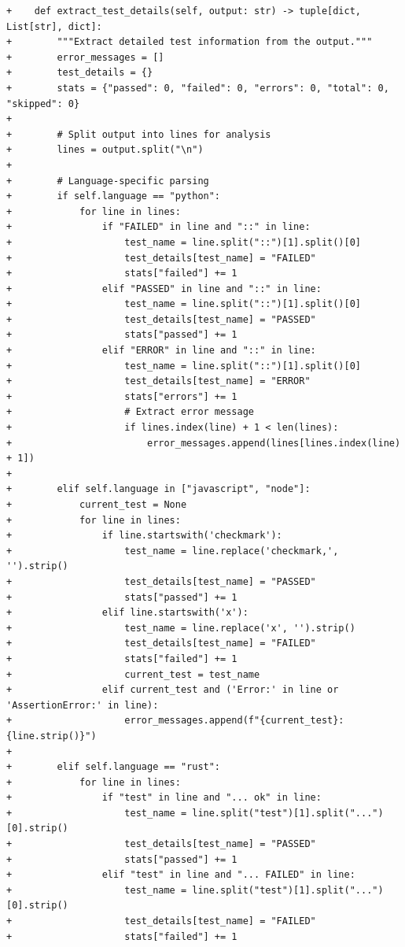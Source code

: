 \documentclass{article} %
\begin{document}
\begin{lstlisting}[style=diffstyle]
+    def extract_test_details(self, output: str) -> tuple[dict, List[str], dict]:
+        """Extract detailed test information from the output."""
+        error_messages = []
+        test_details = {}
+        stats = {"passed": 0, "failed": 0, "errors": 0, "total": 0, "skipped": 0}
+
+        # Split output into lines for analysis
+        lines = output.split("\n")
+        
+        # Language-specific parsing
+        if self.language == "python":
+            for line in lines:
+                if "FAILED" in line and "::" in line:
+                    test_name = line.split("::")[1].split()[0]
+                    test_details[test_name] = "FAILED"
+                    stats["failed"] += 1
+                elif "PASSED" in line and "::" in line:
+                    test_name = line.split("::")[1].split()[0]
+                    test_details[test_name] = "PASSED"
+                    stats["passed"] += 1
+                elif "ERROR" in line and "::" in line:
+                    test_name = line.split("::")[1].split()[0]
+                    test_details[test_name] = "ERROR"
+                    stats["errors"] += 1
+                    # Extract error message
+                    if lines.index(line) + 1 < len(lines):
+                        error_messages.append(lines[lines.index(line) + 1])
+        
+        elif self.language in ["javascript", "node"]:
+            current_test = None
+            for line in lines:
+                if line.startswith('checkmark'):
+                    test_name = line.replace('checkmark,', '').strip()
+                    test_details[test_name] = "PASSED"
+                    stats["passed"] += 1
+                elif line.startswith('x'):
+                    test_name = line.replace('x', '').strip()
+                    test_details[test_name] = "FAILED"
+                    stats["failed"] += 1
+                    current_test = test_name
+                elif current_test and ('Error:' in line or 'AssertionError:' in line):
+                    error_messages.append(f"{current_test}: {line.strip()}")
+
+        elif self.language == "rust":
+            for line in lines:
+                if "test" in line and "... ok" in line:
+                    test_name = line.split("test")[1].split("...")[0].strip()
+                    test_details[test_name] = "PASSED"
+                    stats["passed"] += 1
+                elif "test" in line and "... FAILED" in line:
+                    test_name = line.split("test")[1].split("...")[0].strip()
+                    test_details[test_name] = "FAILED"
+                    stats["failed"] += 1

\end{lstlisting}
\end{document}
